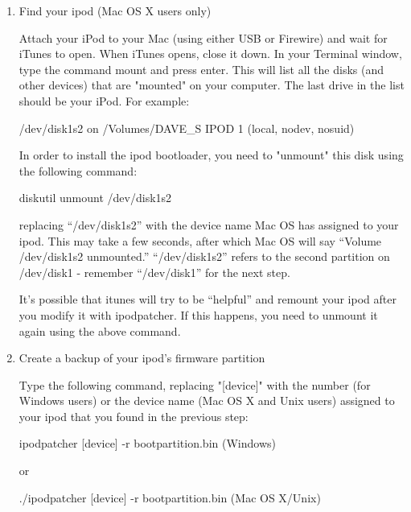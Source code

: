 \begin{enumerate}

  \item Find your ipod (Mac OS X users only)

    Attach your iPod to your Mac (using either USB or Firewire) and wait for 
    iTunes to open. When iTunes opens, close it down.  In your Terminal window, 
    type the command mount and press enter. This will list all the disks (and 
    other devices) that are "mounted" on your computer. The last  drive in the 
    list should be your iPod. For example: 
    \begin{code}
       /dev/disk1s2 on /Volumes/DAVE_S IPOD 1 (local, nodev, nosuid) 
    \end{code}

    In order to install the ipod bootloader, you need to "unmount" this disk 
    using the following command: 
      \begin{code} 
        diskutil unmount /dev/disk1s2 
      \end{code}
      
    replacing ``/dev/disk1s2'' with the device name Mac OS has assigned to your
    ipod. This may take a few seconds, after which Mac OS will say ``Volume 
    /dev/disk1s2 unmounted.'' ``/dev/disk1s2'' refers to the second partition on 
    /dev/disk1 - remember   ``/dev/disk1'' for the next step.

    It's possible that itunes will try to be ``helpful'' and remount your ipod 
    after you modify it with ipodpatcher. If this happens, you need to unmount 
    it again using the above command. 
  
  \item Create a backup of your ipod's firmware partition

    Type the following command, replacing "[device]" with the number (for 
    Windows users) or the device name (Mac OS X and Unix users) assigned to 
    your ipod that  you found in the previous step: 
      \begin{code} 
        ipodpatcher [device] -r bootpartition.bin (Windows) 
      \end{code}
      or
      \begin{code}
        ./ipodpatcher [device] -r bootpartition.bin (Mac OS X/Unix)
      \end{code}
  

\end{enumerate}
